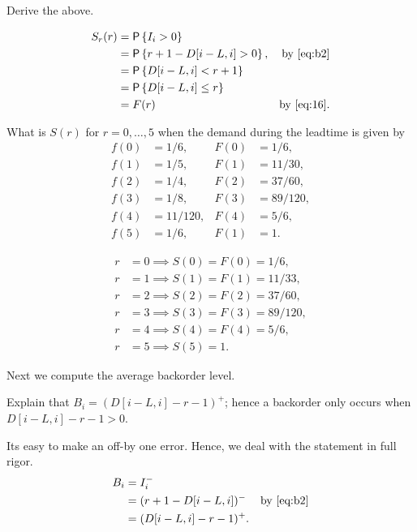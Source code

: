 \begin{exercise}
Derive the above.
\begin{solution}
\begin{align*}
   S_r(r) &= \P{\IL_i >0} \\
   &= \P{r+1 - D[i-L, i] >0}, &\text{by \eqref{eq:b2}}  \\
   &= \P{D[i-L, i] <  r+1} \\
   & = \P{D[i-L, i] \leq  r}\\
   & = F(r)  &\text{by~\eqref{eq:16}}.
\end{align*}
\end{solution}
\end{exercise}


\begin{exercise}\label{q:basestock}
What is $S(r)$ for $r=0, \ldots, 5$ when the demand during the leadtime is given by
  \begin{align*}
    f(0) &= 1/6, & F(0) &= 1/6,  \\
    f(1) &= 1/5, & F(1)  &= 11/30,  \\
    f(2)&= 1/4, & F(2) &= 37/60, \\
    f(3) &= 1/8, & F(3)&= 89/120, \\
    f(4) &= 11/120, & F(4) &= 5/6, \\
    f(5) &= 1/6, & F(1)  &= 1.
  \end{align*}

\begin{solution}
\begin{align*}
  r &= 0 \implies S(0) = F(0) = 1/6, \\
  r &= 1 \implies S(1) = F(1) = 11/33, \\
  r &= 2 \implies S(2) = F(2) = 37/60,\\
  r &= 3 \implies S(3) = F(3) = 89/120, \\
  r &= 4 \implies S(4) = F(4) = 5/6, \\
  r &= 5 \implies S(5) = 1.
\end{align*}
\end{solution}
\end{exercise}

Next we compute the average backorder level. 

\begin{exercise}
Explain that $B_i = (D[i-L, i] - r - 1)^+$; hence a backorder only occurs  when $D[i-L, i] - r-1>0$. 
\begin{solution} Its easy to make an off-by one error. Hence, we deal with the statement in full rigor.
  \begin{align*}
    B_i 
&= I_i^- \\
&= (r+1-D[i-L, i])^- &\text{by~\eqref{eq:b2}}\\
&= (D[i-L, i]-r-1)^+.
  \end{align*}
\end{solution}
\end{exercise}

